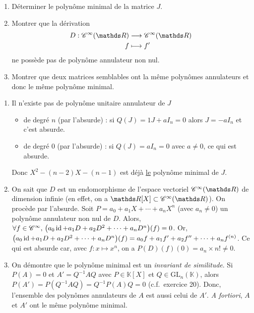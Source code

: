 \begin{exo}
	\slshape
	\begin{enumerate}
		\item Déterminer le polynôme minimal de la matrice $J$.
		\item Montrer que la dérivation  \begin{align*}
				D: \mathscr{C}^\infty(\R) &\longrightarrow \mathscr{C}^\infty(\R) \\
				f &\longmapsto f'
			\end{align*} ne possède pas de polynôme annulateur non nul.
		\item Montrer que deux matrices semblables ont la même polynômes annulateurs et donc le même polynôme minimal.
	\end{enumerate}
	\upshape

	\begin{enumerate}
		\item Il n'existe pas de polynôme unitaire annulateur de $J$\/
			\begin{itemize}
				\item de degré $n$\/ (par l'absurde) : si $Q(J) = 1J + a I_n = 0$\/ alors $J = -aI_n$\/ et c'est absurde.
				\item de degré $0$\/ (par l'absurde) : si $Q(J) = a I_n = 0$\/ avec $a \neq 0$, ce qui est absurde.
			\end{itemize}
			Donc $X^2 - (n-2) X - (n-1)$\/ est déjà \underline{le} polynôme minimal de $J$.
		\item On sait que $D$\/ est un endomorphisme de l'espace vectoriel $\mathscr{C}^\infty(\R)$ de dimension infinie (en effet, on a $\R[X] \subset \mathscr{C}^\infty(\R)$). On procède par l'absurde. Soit $P = a_0 + a_1 X + \cdots + a_n X^n$\/ (avec $a_n \neq 0$) un polynôme annulateur non nul de $D$. Alors, $\forall f \in \mathscr{C}^\infty,\,\big(a_0\operatorname{id}  + a_1 D + a_2 D^2 + \cdots + a_n D^n\big)(f) = 0$. Or, $\big(a_0\operatorname{id}  + a_1 D + a_2 D^2 + \cdots + a_n D^n\big)(f) = a_0 f + a_1 f' + a_2 f'' + \cdots + a_n f^{(n)}$. Ce qui est absurde car, avec $f : x \mapsto x^{n}$, on a $P(D)(f)(0) = a_n \times n! \neq 0$.
		\item On démontre que le polynôme minimal est un {\it invariant de similitude}.
			Si $P(A) = 0$\/ et $A' = Q^{-1} A Q$\/ avec $P \in \mathds{K}[X]$\/ et $Q \in \mathrm{GL}_n(\mathds{K})$, alors $P(A') = P(Q^{-1} A Q) = Q^{-1} P(A) Q = 0$ (c.f.\ {\sc exercice 20}). Donc, l'ensemble des polynômes annulateurs de $A$\/ est aussi celui de $A'$. {\it A fortiori}, $A$\/ et $A'$\/ ont le même polynôme minimal.
	\end{enumerate}
\end{exo}

